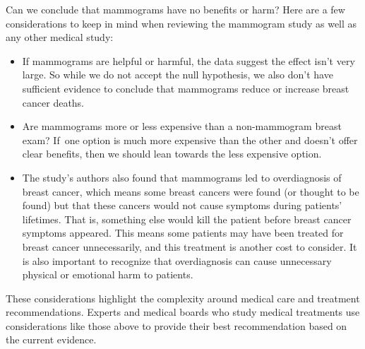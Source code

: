 Can we conclude that mammograms have no benefits or harm?
Here are a few considerations to keep in mind when reviewing
the mammogram study as well as any other medical study:
\begin{itemize}
\setlength{\itemsep}{0mm}
\item If mammograms are helpful or harmful, the data suggest the effect isn't very large. So while we do not accept the null hypothesis, we also don't have sufficient evidence to conclude that mammograms reduce or increase breast cancer deaths.
\item Are mammograms more or less expensive than a non-mammogram breast exam? If~one option is much more expensive than the other and doesn't offer clear benefits, then we should lean towards the less expensive option.
\item The study's authors also found that mammograms led to overdiagnosis of breast cancer, which means some breast cancers were found (or thought to be found) but that these cancers would not cause symptoms during patients' lifetimes. That is, something else would kill the patient before breast cancer symptoms appeared. This means some patients may have been treated for breast cancer unnecessarily, and this treatment is another cost to consider. It is also important to recognize that overdiagnosis can cause unnecessary physical or emotional harm to patients.
\end{itemize}
These considerations highlight the complexity around medical care and treatment recommendations. Experts and medical boards who study medical treatments use considerations like those above to provide their best recommendation based on the current evidence.





